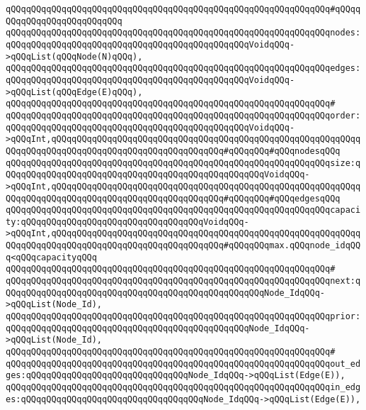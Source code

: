 \verb|qQQqqQQqqQQqqQQqqQQqqQQqqQQqqQQqqQQqqQQqqQQqqQQqqQQqqQQqqQQqqQQq#qQQqqQQqqQQqqQQqqQQqqQQqqQQq|\newline
\verb|qQQqqQQqqQQqqQQqqQQqqQQqqQQqqQQqqQQqqQQqqQQqqQQqqQQqqQQqqQQqqQQqnodes:qQQqqQQqqQQqqQQqqQQqqQQqqQQqqQQqqQQqqQQqqQQqqQQqVoidqQQq->qQQqList(qQQqNode(N)qQQq),|\newline
\verb|qQQqqQQqqQQqqQQqqQQqqQQqqQQqqQQqqQQqqQQqqQQqqQQqqQQqqQQqqQQqqQQqedges:qQQqqQQqqQQqqQQqqQQqqQQqqQQqqQQqqQQqqQQqqQQqqQQqVoidqQQq->qQQqList(qQQqEdge(E)qQQq),|\newline
\verb|qQQqqQQqqQQqqQQqqQQqqQQqqQQqqQQqqQQqqQQqqQQqqQQqqQQqqQQqqQQqqQQq#|\newline
\verb|qQQqqQQqqQQqqQQqqQQqqQQqqQQqqQQqqQQqqQQqqQQqqQQqqQQqqQQqqQQqqQQqorder:qQQqqQQqqQQqqQQqqQQqqQQqqQQqqQQqqQQqqQQqqQQqqQQqVoidqQQq->qQQqInt,qQQqqQQqqQQqqQQqqQQqqQQqqQQqqQQqqQQqqQQqqQQqqQQqqQQqqQQqqQQqqQQqqQQqqQQqqQQqqQQqqQQqqQQqqQQqqQQqqQQqqQQq#qQQqqQQq#qQQqnodesqQQq|\newline
\verb|qQQqqQQqqQQqqQQqqQQqqQQqqQQqqQQqqQQqqQQqqQQqqQQqqQQqqQQqqQQqqQQqsize:qQQqqQQqqQQqqQQqqQQqqQQqqQQqqQQqqQQqqQQqqQQqqQQqqQQqVoidqQQq->qQQqInt,qQQqqQQqqQQqqQQqqQQqqQQqqQQqqQQqqQQqqQQqqQQqqQQqqQQqqQQqqQQqqQQqqQQqqQQqqQQqqQQqqQQqqQQqqQQqqQQqqQQqqQQq#qQQqqQQq#qQQqedgesqQQq|\newline
\verb|qQQqqQQqqQQqqQQqqQQqqQQqqQQqqQQqqQQqqQQqqQQqqQQqqQQqqQQqqQQqqQQqcapacity:qQQqqQQqqQQqqQQqqQQqqQQqqQQqqQQqqQQqVoidqQQq->qQQqInt,qQQqqQQqqQQqqQQqqQQqqQQqqQQqqQQqqQQqqQQqqQQqqQQqqQQqqQQqqQQqqQQqqQQqqQQqqQQqqQQqqQQqqQQqqQQqqQQqqQQqqQQq#qQQqqQQqmax.qQQqnode_idqQQq<qQQqcapacityqQQq|\newline
\verb|qQQqqQQqqQQqqQQqqQQqqQQqqQQqqQQqqQQqqQQqqQQqqQQqqQQqqQQqqQQqqQQq#|\newline
\verb|qQQqqQQqqQQqqQQqqQQqqQQqqQQqqQQqqQQqqQQqqQQqqQQqqQQqqQQqqQQqqQQqnext:qQQqqQQqqQQqqQQqqQQqqQQqqQQqqQQqqQQqqQQqqQQqqQQqqQQqNode_IdqQQq->qQQqList(Node_Id),|\newline
\verb|qQQqqQQqqQQqqQQqqQQqqQQqqQQqqQQqqQQqqQQqqQQqqQQqqQQqqQQqqQQqqQQqprior:qQQqqQQqqQQqqQQqqQQqqQQqqQQqqQQqqQQqqQQqqQQqqQQqNode_IdqQQq->qQQqList(Node_Id),|\newline
\verb|qQQqqQQqqQQqqQQqqQQqqQQqqQQqqQQqqQQqqQQqqQQqqQQqqQQqqQQqqQQqqQQq#|\newline
\verb|qQQqqQQqqQQqqQQqqQQqqQQqqQQqqQQqqQQqqQQqqQQqqQQqqQQqqQQqqQQqqQQqout_edges:qQQqqQQqqQQqqQQqqQQqqQQqqQQqqQQqNode_IdqQQq->qQQqList(Edge(E)),|\newline
\verb|qQQqqQQqqQQqqQQqqQQqqQQqqQQqqQQqqQQqqQQqqQQqqQQqqQQqqQQqqQQqqQQqin_edges:qQQqqQQqqQQqqQQqqQQqqQQqqQQqqQQqqQQqNode_IdqQQq->qQQqList(Edge(E)),|\newline
